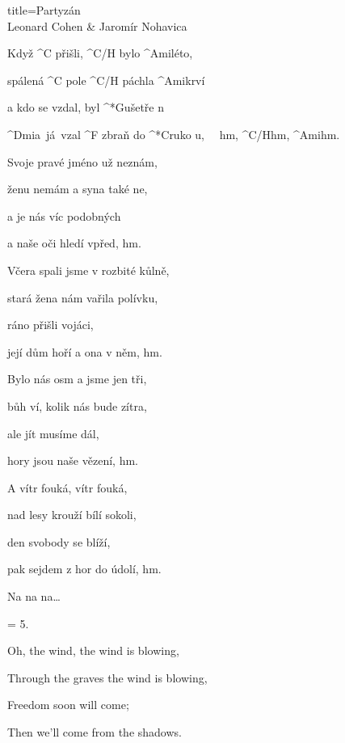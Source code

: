 \begin{song}{title=\predtitle\centering Partyzán  \\\large Leonard Cohen \& Jaromír Nohavica  \vspace*{-0.3cm}}  %
\begin{centerjustified}

\sloka 
	Když ^{C \z}přišli, ^{C/H \z}bylo ^{\z Ami}léto,~~

	spálená ^{C \z}pole ^{C/H \z}páchla ^{\z Ami}krví~~

	a kdo se vzdal, byl ^*{\z G}ušetře n

	^{Dmi\z}a~já~vzal ^{F \z}zbraň do ^*{\z C}ruko u,~~ hm, ^{C/H}hm, ^{Ami}hm.

\sloka
	Svoje pravé jméno už neznám,
	
	ženu nemám a syna také ne,
	
	a je nás víc podobných
	
	a naše oči hledí vpřed, hm.

\sloka
	Včera spali jsme v rozbité kůlně,
	
	 stará žena nám vařila polívku,
	
	ráno přišli vojáci,
	
	její dům hoří a ona v něm, hm.

\sloka
	Bylo nás osm a jsme jen tři,
	
	bůh ví, kolik nás bude zítra,
	
	ale jít musíme dál,
	
	hory jsou naše vězení, hm.
	
\sloka
	A vítr fouká, vítr fouká,
	
	nad lesy krouží bílí sokoli,
	
	den svobody se blíží,
	
	pak sejdem z hor do údolí, hm.

\sloka
Na na na\elipsa\dots

\sloka = 5. 

\phantom{.}

Oh, the wind, the wind is blowing,

Through the graves the wind is blowing,

Freedom soon will come;

Then we'll come from the shadows.

\end{centerjustified}

\centering
{}

\setcounter{Slokočet}{0}
\end{song}
